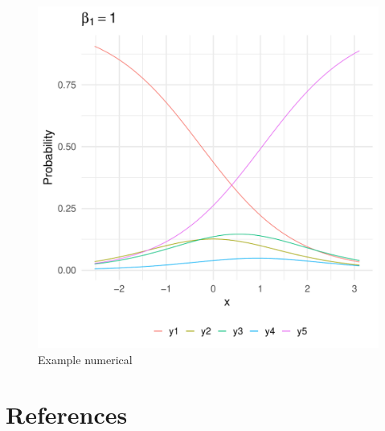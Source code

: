 \documentclass[
  man,floatsintext]{apa6}
\begin{document}
\begin{figure}

{\centering \includegraphics{paper-new_files/figure-latex/ex-numerical-1} 

}

\caption{Example numerical}\label{fig:ex-numerical}
\end{figure}

\newpage

\section{References}\label{references}
\end{document}
